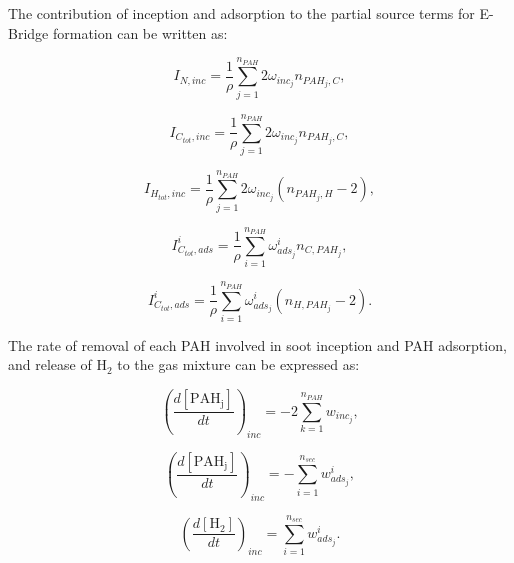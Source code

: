 The contribution of inception and adsorption to the partial source terms for E-Bridge formation can be written as:

\begin{equation}
	I_{N,{inc}} = \frac{1}{\rho}
	\sum_{j=1}^{n_{PAH}}
	2\omega_{inc_{j}}
	n_{PAH_j,C}
	\label{eqn:IN_inc_ebri},
\end{equation}

\begin{equation}
	I_{C_{tot},{inc}} = \frac{1}{\rho}
	\sum_{j=1}^{n_{PAH}}
	2\omega_{inc_{j}} 
	n_{PAH_j,C}
	\label{eqn:ICtot_inc_ebri},
\end{equation}

\begin{equation}
	I_{H_{tot},{inc}} = \frac{1}{\rho}
	\sum_{j=1}^{n_{PAH}}
	2\omega_{inc_{j}} 
	\left(
	n_{PAH_j,H}-2
	\right)
	\label{eqn:IHtot_inc_ebri},
\end{equation}

\begin{equation}
	I^i_{C_{tot},ads} =
	\frac{1}{\rho}
	\sum_{i=1}^{n_{PAH}}
	\omega^i_{ads_j}
	n_{C,PAH_j}
	\label{eqn:ICtotads_ebri},
\end{equation}

\begin{equation}
	I^i_{C_{tot},ads} =
	\frac{1}{\rho}
	\sum_{i=1}^{n_{PAH}}
	\omega^i_{ads_j}
	\left(n_{H,PAH_j}-2\right)
	\label{eqn:IHtotads_ebri}.
\end{equation}

The rate of removal of each PAH involved in soot inception and PAH adsorption, and release of $\mathrm{H_2}$ to the gas mixture can be expressed as:

\begin{equation}
	\left(
	\frac{d\left[{\mathrm{PAH_j}}\right]}{dt}
	\right)_{inc}
	= 
	-2\sum_{k=1}^{n_{PAH}}w_{inc_{j}},
\end{equation}

\begin{equation}
	\left(
	\frac{d\left[{\mathrm{PAH_j}}\right]}{dt}
	\right)_{inc}
	= 
	-\sum_{i=1}^{n_{sec}}w^i_{ads_j},
	\label{eqn:PAHscrub_ebri_ads}
\end{equation}

\begin{equation}
	\left(
	\frac{d\left[{\mathrm{H_2}}\right]}{dt}
	\right)_{inc}
	= 
	\sum_{i=1}^{n_{sec}}w^i_{ads_j}.
	\label{eqn:H2scrub_ebri}
\end{equation}

